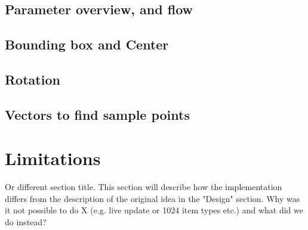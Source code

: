 \subsection{Parameter overview, and flow }
\subsection{Bounding box and Center}
\subsection{Rotation}
\subsection{Vectors to find sample points}


\section{Limitations}
Or different section title. This section will describe how the implementation differs from the description of the original idea in the "Design" section. Why was it not possible to do X (e.g. live update or 1024 item types etc.) and what did we do instead?